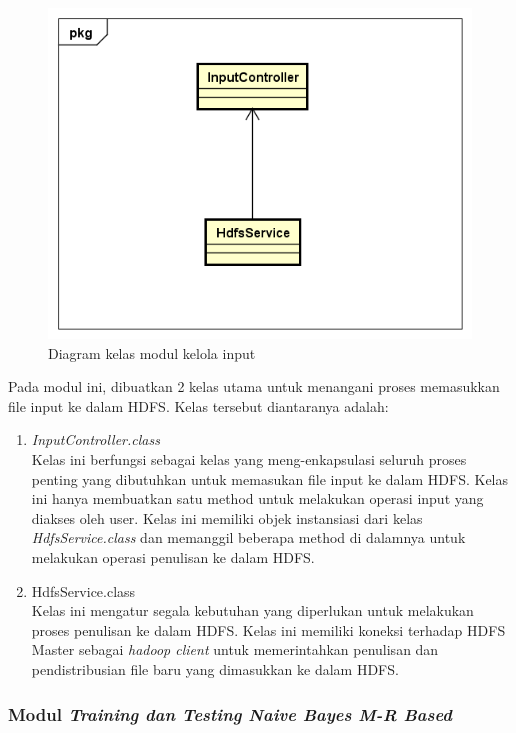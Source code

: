 \begin{figure}[H]
	\centering
	\includegraphics[scale=0.7]{ClassDiagram/Simple_CD_Input}
	\caption[Diagram kelas modul kelola input]{Diagram kelas modul kelola input}
	\label{fig:Diagram kelas modul kelola input}
\end{figure}

Pada modul ini, dibuatkan 2 kelas utama untuk menangani proses memasukkan file input ke dalam HDFS. Kelas tersebut diantaranya adalah:
\begin{enumerate}
\item{\textit{InputController.class}} \\
Kelas ini berfungsi sebagai kelas yang meng-enkapsulasi seluruh proses penting yang dibutuhkan untuk memasukan file input ke dalam HDFS. Kelas ini hanya membuatkan satu method untuk melakukan operasi input yang diakses oleh user. Kelas ini memiliki objek instansiasi dari kelas \textit{HdfsService.class} dan memanggil beberapa method di dalamnya untuk melakukan operasi penulisan ke dalam HDFS.
\item{HdfsService.class} \\
Kelas ini mengatur segala kebutuhan yang diperlukan untuk melakukan proses penulisan ke dalam HDFS. Kelas ini memiliki koneksi terhadap HDFS Master sebagai \textit{hadoop client} untuk memerintahkan penulisan dan pendistribusian file baru yang dimasukkan ke dalam HDFS.
\end{enumerate}

\subsubsection{Modul \textit{Training dan Testing Naive Bayes M-R Based}}

